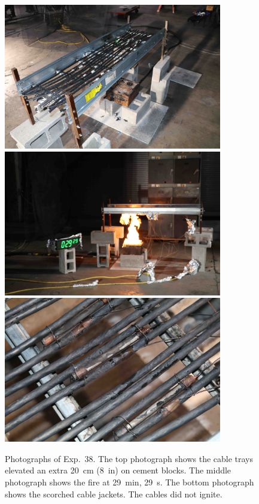 \begin{figure}[p]
\centering
\includegraphics[height=2.50in]{../FIGURES/Test_38_setup} \\ \vspace{0.1in}
\includegraphics[height=2.50in]{../FIGURES/Test_38_29_min_29_s} \\ \vspace{0.1in}
\includegraphics[height=2.50in]{../FIGURES/Test_38_damage}
\caption[Photographs of Exp.~38]{Photographs of Exp.~38. The top photograph shows the cable trays elevated an extra 20~cm (8~in) on cement blocks. The middle photograph shows the fire at 29~min, 29~s. The bottom photograph shows the scorched cable jackets. The cables did not ignite.}
\label{fig:Test_38_photos}
\end{figure}


